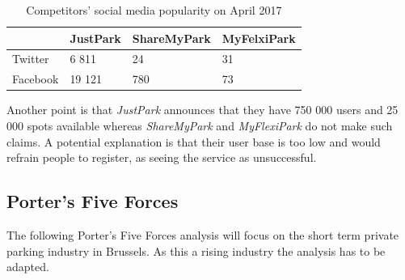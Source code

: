 \documentclass[12pt,a4paper,oneside]{book}
\begin{document}
\begin{table}[h]
\centering
\caption{Competitors' social media popularity on April 2017}
\label{smp}
\begin{tabular}{l|l|l|l|}
\cline{2-4}
                               & JustPark & ShareMyPark & MyFelxiPark \\ \hline
\multicolumn{1}{|l|}{Twitter}  & 6 811    & 24          & 31          \\ \hline
\multicolumn{1}{|l|}{Facebook} & 19 121   & 780         & 73          \\ \hline
\end{tabular}
\end{table}

Another point is that \textit{JustPark} announces that they have 750 000 users\cite{jpu} and 25 000 spots available\cite{jpd} whereas \textit{ShareMyPark} and \textit{MyFlexiPark} do not make such claims. A potential explanation is that their user base is too low and would refrain people to register, as seeing the service as unsuccessful.



\subsection{Porter’s Five Forces}
The following Porter's Five Forces analysis will focus on the short term private parking industry in Brussels. As this a rising industry the analysis has to be adapted.\\
\end{document}
